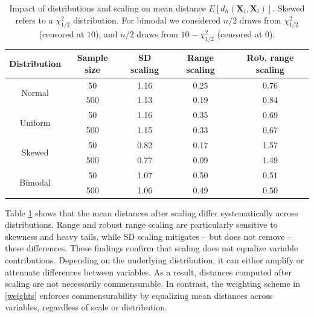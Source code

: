 \documentclass[12pt]{article}
\begin{document}
\begin{table}[!ht]
\caption{Impact of distributions and scaling on mean distance $E[d_{h}(\bm{X}_i, \bm{X}_l)]$. Skewed refers to a $\chi^2_{1/2}$ distribution. For bimodal we considered $n/2$ draws from $\chi^2_{1/2}$  (censored at $10$), and $n/2$ draws from $10-\chi^2_{1/2}$ (censored at $0$).}
\label{table:scaling_impact}
\centering
\begin{tabular}{ccccc}
\toprule
Distribution & Sample size & SD scaling & Range scaling & Rob. range scaling \\
\midrule
\multirow{2}{*}{Normal} & 50    & 1.16     & 0.25  & 0.76         \\
& 500    & 1.13     & 0.19  & 0.84         \\ \midrule
\multirow{2}{*}{Uniform} & 50   & 1.16     & 0.35  & 0.69         \\
 & 500      & 1.15     & 0.33  & 0.67         \\ \midrule
\multirow{2}{*}{Skewed} & 50   & 0.82     & 0.17  & 1.57     \\
 & 500   &  0.77    & 0.09  & 1.49     \\
\midrule
\multirow{2}{*}{Bimodal} & 50   & 1.07     & 0.50  & 0.51     \\
 & 500   & 1.06     & 0.49  & 0.50     \\
\bottomrule
\end{tabular}
\end{table}
Table \ref{table:scaling_impact} shows that the mean distances after scaling differ systematically across distributions. Range and robust range scaling are particularly sensitive to skewness and heavy tails, while SD scaling mitigates -- but does not remove -- these differences. These findings confirm that scaling does not equalize variable contributions. Depending on the underlying distribution, it can either amplify or attenuate differences between variables. As a result, distances computed after scaling are not necessarily commensurable. In contrast, the weighting scheme in \eqref{weights} enforces commensurability by equalizing mean distances across variables, regardless of scale or distribution.
\end{document}

